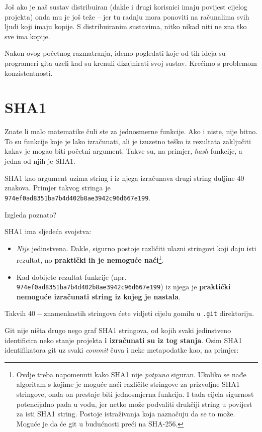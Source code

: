 Još ako je naš sustav distribuiran (dakle i drugi korisnici imaju povijest cijelog projekta) onda mu je još teže -- jer tu radnju mora ponoviti na računalima svih ljudi koji imaju kopije.
S distribuiranim sustavima, nitko nikad niti ne zna tko sve ima kopije.

Nakon ovog početnog razmatranja, idemo pogledati koje od tih ideja su programeri gita uzeli kad su krenuli dizajnirati svoj sustav.
Krećimo s problemom konzistentnosti.

\section*{SHA1}

Znate li malo matematike čuli ste za jednosmerne funkcije.
Ako i niste, nije bitno. 
To su funkcije koje je lako izračunati, ali je izuzetno teško iz rezultata zaključiti kakav je mogao biti početni argument.
Takve su, na primjer, \emph{hash} funkcije, a jedna od njih je SHA1.

SHA1 kao argument uzima string i iz njega izračunava drugi string duljine $40$ znakova.
Primjer takvog stringa je \verb+974ef0ad8351ba7b4d402b8ae3942c96d667e199+.

Izgleda poznato?

SHA1 ima sljedeća svojstva:

\begin{itemize}
	\item \emph{Nije} jedinstvena. Dakle, sigurno postoje različiti ulazni stringovi koji daju isti rezultat, no \textbf{praktički ih je nemoguće naći}\footnote{Ovdje treba napomenuti kako SHA1 nije \emph{potpuno} siguran. Ukoliko se nađe algoritam s kojime je moguće naći različite stringove za prizvoljne SHA1 stringove, onda on prestaje biti jednosmjerna funkcija. I tada cijela sigurnost potencijalno pada u vodu, jer netko može podvaliti drukčiji string u povijest za isti SHA1 string. Postoje istraživanja koja naznačuju da se to može. Moguće je da će git u budućnosti preći na SHA-256.}. 
	\item Kad dobijete rezultat funkcije (npr. \verb+974ef0ad8351ba7b4d402b8ae3942c96d667e199+) iz njega je \textbf{praktički nemoguće izračunati string iz kojeg je nastala}.
\end{itemize}

Takvih $40-$znamenkastih stringova ćete vidjeti cijelu gomilu u \verb+.git+ direktoriju.

Git nije ništa drugo nego graf SHA1 stringova, od kojih svaki jedinstveno identificira neko stanje projekta \textbf{i izračunati su iz tog stanja}.
Osim SHA1 identifikatora git uz svaki \emph{commit} čuva i neke metapodatke kao, na primjer:

